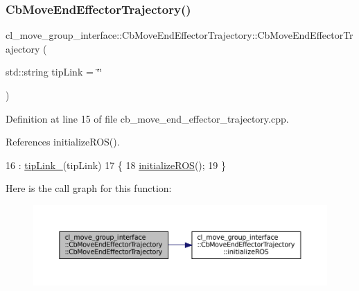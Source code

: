 \subsubsection{\texorpdfstring{Cb\+Move\+End\+Effector\+Trajectory()}{CbMoveEndEffectorTrajectory()}\hspace{0.1cm}{\footnotesize\ttfamily [1/2]}}
{\footnotesize\ttfamily cl\+\_\+move\+\_\+group\+\_\+interface\+::\+Cb\+Move\+End\+Effector\+Trajectory\+::\+Cb\+Move\+End\+Effector\+Trajectory (\begin{DoxyParamCaption}\item[{std\+::string}]{tip\+Link = {\ttfamily \char`\"{}\char`\"{}} }\end{DoxyParamCaption})}



Definition at line 15 of file cb\+\_\+move\+\_\+end\+\_\+effector\+\_\+trajectory.\+cpp.



References initialize\+R\+O\+S().


\begin{DoxyCode}
16         : \hyperlink{classcl__move__group__interface_1_1CbMoveEndEffectorTrajectory_a24c6c30b9b0761a61fa002d947bd3e11}{tipLink\_}(tipLink)
17     \{
18         \hyperlink{classcl__move__group__interface_1_1CbMoveEndEffectorTrajectory_afcee8f3853a5cef8806137a304c8a14b}{initializeROS}();
19     \}
\end{DoxyCode}
Here is the call graph for this function\+:
\nopagebreak
\begin{figure}[H]
\begin{center}
\leavevmode
\includegraphics[width=350pt]{classcl__move__group__interface_1_1CbMoveEndEffectorTrajectory_af7e718b0c53e912fd74968abbb0a4810_cgraph}
\end{center}
\end{figure}
\mbox{\label{classcl__move__group__interface_1_1CbMoveEndEffectorTrajectory_ae6985de3f8f0e1ec7dea88c1e551889a}} 
